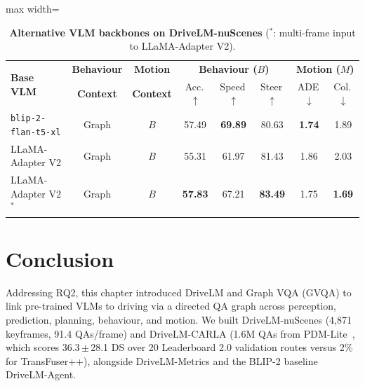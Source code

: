 \begin{table}[t]
  \centering
  \caption[Alternative VLM backbones on DriveLM-nuScenes]{\textbf{Alternative VLM backbones on DriveLM-nuScenes} ($^{*}$: multi-frame input to LLaMA-Adapter V2).}
  \label{drivelm:tab:llama}
  \begin{adjustbox}{max width=\textwidth}
  \begin{tabular}{l|cc|ccc|cc}
    \toprule
    \multirow{2}{*}{\textbf{Base VLM}} & \textbf{Behaviour} & \textbf{Motion} & \multicolumn{3}{c|}{\textbf{Behaviour ($B$)}} & \multicolumn{2}{c}{\textbf{Motion ($M$)}} \\
    & \textbf{Context} & \textbf{Context} & Acc.\,$\uparrow$ & Speed\,$\uparrow$ & Steer\,$\uparrow$ & ADE\,$\downarrow$ & Col.\,$\downarrow$ \\
    \midrule
    \texttt{blip-2-flan-t5-xl} & Graph & $B$ & 57.49 & \textbf{69.89} & 80.63 & \textbf{1.74} & 1.89 \\
    \rowcolor[gray]{0.9} LLaMA-Adapter V2 & Graph & $B$ & 55.31 & 61.97 & 81.43 & 1.86 & 2.03 \\
    \rowcolor[gray]{0.9} LLaMA-Adapter V2$^{*}$ & Graph & $B$ & \textbf{57.83} & 67.21 & \textbf{83.49} & 1.75 & \textbf{1.69} \\
    \bottomrule
  \end{tabular}
  \end{adjustbox}
\end{table}

\FloatBarrier
\section{Conclusion}\label{drivelm:sec:summary}

Addressing RQ2, this chapter introduced DriveLM and Graph VQA (GVQA) to link pre-trained VLMs to driving via a directed QA graph across perception, prediction, planning, behaviour, and motion. We built DriveLM-nuScenes (4,871 keyframes, 91.4 QAs/frame) and DriveLM-CARLA (1.6M QAs from PDM-Lite~\cite{beisswenger2024pdmlite}, which scores 36.3\,$\pm$\,28.1 DS over 20 Leaderboard 2.0 validation routes versus 2\% for TransFuser++), alongside DriveLM-Metrics and the BLIP-2 baseline DriveLM-Agent.

